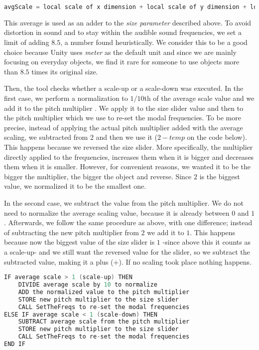 \begin{lstlisting}[language=C]
avgScale = local scale of x dimension + local scale of y dimension + local scale of z dimension / 3
\end{lstlisting}

This average is used as an adder to the \textit{size parameter} described above. To avoid distortion in sound and to stay within the audible sound frequencies, we set a limit of adding $8.5$, a number found heuristically. We consider this to be a good choice because Unity\textsuperscript{\textregistered} uses \textit{meter} as the default unit and since we are mainly focusing on everyday objects, we find it rare for someone to use objects more than $8.5$ times its original size.

Then, the tool checks whether a scale-up or a scale-down was executed. In the first case, we perform a normalization to $1/10$th of the average scale value and we add it to the pitch multiplier . We apply it to the size slider value and then to the pitch multiplier which we use to re-set the modal frequencies. To be more precise, instead of applying the actual pitch multiplier added with the average scaling, we subtracted from 2 and then we use it ($2-temp$ on the code below). This happens because we reversed the size slider. More specifically, the multiplier directly applied to the frequencies, increases them when it is bigger and decreases them when it is smaller. However, for convenient reasons, we wanted it to be the bigger the multiplier, the bigger the object and reverse. Since $2$ is the biggest value, we normalized it to be the smallest one.

In the second case, we subtract the value from the pitch multiplier. We do not need to normalize the average scaling value, because it is already between $0$ and $1$. Afterwards, we follow the same procedure as above, with one difference; instead of subtracting the new pitch multiplier from $2$ we add it to $1$. This happens because now the biggest value of the size slider is $1$ -since above this it counts as a scale-up- and we still want the reversed value for the slider, so we subtract the subtracted value, making it a plus ($+$). If no scaling took place nothing happens.

\begin{lstlisting}[language=C]
IF average scale > 1 (scale-up) THEN
    DIVIDE average scale by 10 to normalize
    ADD the normalized value to the pitch multiplier
    STORE new pitch multiplier to the size slider
    CALL SetTheFreqs to re-set the modal frequencies
ELSE IF average scale < 1 (scale-down) THEN
    SUBTRACT average scale from the pitch multiplier
    STORE new pitch multiplier to the size slider
    CALL SetTheFreqs to re-set the modal frequencies
END IF
\end{lstlisting}



